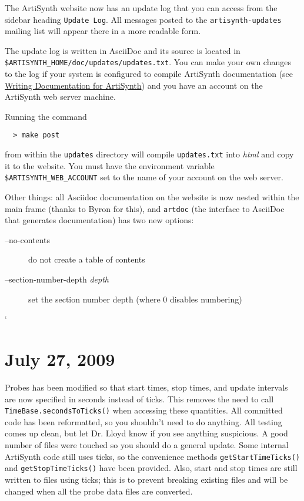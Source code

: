 \documentclass{article}
\begin{document}
The ArtiSynth website now has an update log that you can access from
the sidebar heading {\tt Update Log}. All messages posted to the
{\tt artisynth-updates} mailing list will appear there in a more readable
form.

The update log is written in AsciiDoc and its source is located in
{\tt \$ARTISYNTH\_HOME/doc/updates/updates.txt}. You can make your own
changes to the log if your system is configured to compile ArtiSynth
documentation (see
\href{http://www.magic.ubc.ca/artisynth/pmwiki.php?n=Documentation.Documentation}{%
Writing Documentation for ArtiSynth}) and you have an account on the ArtiSynth
web server machine.

Running the command

\begin{verbatim}
  > make post
\end{verbatim}

from within the {\tt updates} directory will compile {\tt updates.txt} into
{\it html} and copy it to the website. You must have the environment
variable {\tt \$ARTISYNTH\_WEB\_ACCOUNT} set to the name of your account on
the web server.

Other things: all Asciidoc documentation on the website is now nested
within the main frame (thanks to Byron for this), and {\tt artdoc} (the
interface to AsciiDoc that generates documentation) has two new
options:

\begin{description}

\item[--no-contents] \mbox{}
	do not create a table of contents

\item[--section-number-depth {\it depth}] \mbox{}
	set the section number depth (where 0 disables numbering)

\end{description}
`
\section*{July 27, 2009}

Probes has been modified so that start times, stop times, and update
intervals are now specified in seconds instead of ticks. This removes
the need to call {\tt TimeBase.secondsToTicks()} when accessing these 
quantities.
All committed code has been reformatted, so you shouldn't need to do 
anything. All testing comes up clean, but let Dr. Lloyd know if you 
see anything suspicious. A good number of files were touched so you 
should do a general update.
Some internal ArtiSynth code still uses ticks, so the convenience 
methods {\tt getStartTimeTicks()} and {\tt getStopTimeTicks()} have been
provided. Also, start and stop times are still written to files 
using ticks; this is to prevent breaking existing files and will 
be changed when all the probe data files are converted.
\end{document}
